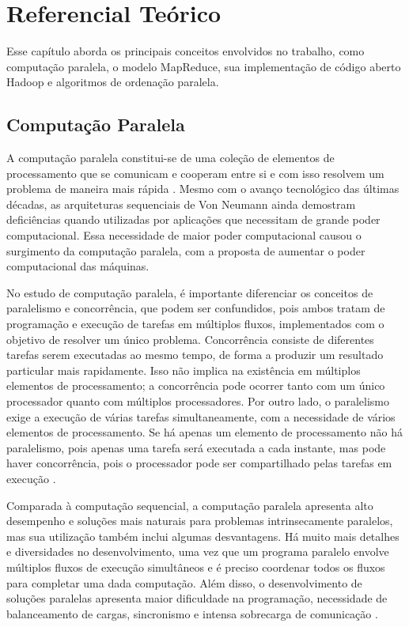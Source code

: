 \chapter{Referencial Teórico}
\label{cap:referencial}

Esse capítulo aborda os principais conceitos envolvidos no trabalho,  como computação paralela, o modelo MapReduce, sua implementação de código aberto Hadoop e algoritmos de ordenação paralela.

\section{Computação Paralela}

A computação paralela constitui-se de uma coleção de elementos de processamento que se comunicam e cooperam entre si e com isso resolvem um problema de maneira mais rápida \cite{Almasi:1994}. Mesmo com o avanço tecnológico das últimas décadas, as arquiteturas sequenciais de Von Neumann ainda demostram deficiências quando utilizadas por aplicações que necessitam de grande poder computacional. Essa necessidade de maior poder computacional causou o surgimento da computação paralela, com a proposta de aumentar o poder computacional das máquinas.

No estudo de computação paralela, é importante diferenciar os conceitos de paralelismo e concorrência, que podem ser confundidos, pois ambos tratam de programação e execução de tarefas em múltiplos fluxos, implementados com o objetivo de resolver um único problema. Concorrência consiste de diferentes tarefas serem executadas ao mesmo tempo, de forma a produzir um resultado particular mais rapidamente. Isso não implica na existência em múltiplos elementos de processamento; a concorrência pode ocorrer tanto com um único processador quanto com múltiplos processadores. 
Por outro lado, o paralelismo exige a execução de várias tarefas simultaneamente, com a necessidade de vários elementos de processamento. 
Se há apenas um elemento de processamento não há paralelismo, pois apenas uma tarefa será executada a cada instante, mas pode haver concorrência, pois o processador pode ser compartilhado pelas tarefas em execução \cite{Breshears:2009}.

Comparada à computação sequencial, a computação paralela apresenta alto desempenho e soluções mais naturais para problemas intrinsecamente paralelos, mas sua utilização também inclui algumas desvantagens. Há muito mais detalhes e diversidades no desenvolvimento, uma vez que um programa paralelo envolve múltiplos fluxos de execução simultâneos e é preciso coordenar todos os fluxos para completar uma dada computação. Além disso, o desenvolvimento de soluções paralelas apresenta maior dificuldade na programação, necessidade de balanceamento de cargas, sincronismo e intensa sobrecarga de comunicação \cite{Rauber:2010} . 

